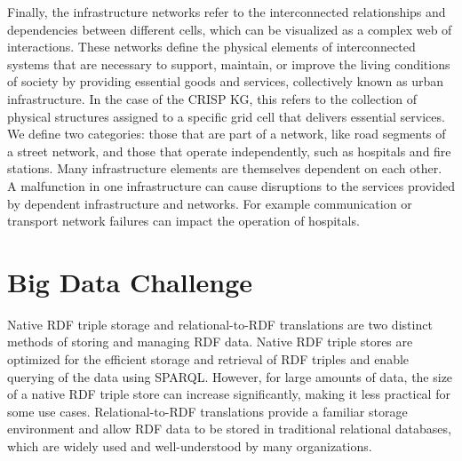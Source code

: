 \documentclass[
]{ceurart}
\begin{document}
Finally, the infrastructure networks refer to the interconnected relationships and dependencies between different cells, which can be visualized as a complex web of interactions. These networks define the physical elements of interconnected systems that are necessary to support, maintain, or improve the living conditions of society by providing essential goods and services, collectively known as urban infrastructure. In the case of the CRISP KG, this refers to the collection of physical structures assigned to a specific grid cell that delivers essential services. We define two categories: those that are part of a network, like road segments of a street network, and those that operate independently, such as hospitals and fire stations. Many infrastructure elements are themselves dependent on each other. A malfunction in one infrastructure can cause disruptions to the services provided by dependent infrastructure and networks. For example communication or transport network failures can impact the operation of hospitals.





\section{Big Data Challenge}


Native RDF triple storage and relational-to-RDF translations are two distinct methods of storing and managing RDF data. Native RDF triple stores are optimized for the efficient storage and retrieval of RDF triples and enable querying of the data using SPARQL. However, for large amounts of data, the size of a native RDF triple store can increase significantly, making it less practical for some use cases. Relational-to-RDF translations provide a familiar storage environment and allow RDF data to be stored in traditional relational databases, which are widely used and well-understood by many organizations.
\end{document}
